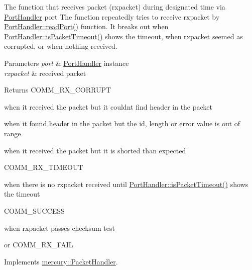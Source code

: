 The function that receives packet (rxpacket) during designated time via \hyperlink{classmercury_1_1_port_handler}{Port\+Handler} port  The function repeatedly tries to receive rxpacket by \hyperlink{classmercury_1_1_port_handler_afa6f52d7b95c5ffd8f0c92477d517c79}{Port\+Handler\+::read\+Port()} function.  It breaks out  when \hyperlink{classmercury_1_1_port_handler_a6733438255ede3d34738842e10cd8fc2}{Port\+Handler\+::is\+Packet\+Timeout()} shows the timeout,  when rxpacket seemed as corrupted, or  when nothing received. 


\begin{DoxyParams}{Parameters}
{\em port} & \hyperlink{classmercury_1_1_port_handler}{Port\+Handler} instance \\
\hline
{\em rxpacket} & received packet \\
\hline
\end{DoxyParams}
\begin{DoxyReturn}{Returns}
C\+O\+M\+M\+\_\+\+R\+X\+\_\+\+C\+O\+R\+R\+U\+PT 

when it received the packet but it couldn\textquotesingle{}t find header in the packet 

when it found header in the packet but the id, length or error value is out of range 

when it received the packet but it is shorted than expected 

C\+O\+M\+M\+\_\+\+R\+X\+\_\+\+T\+I\+M\+E\+O\+UT 

when there is no rxpacket received until \hyperlink{classmercury_1_1_port_handler_a6733438255ede3d34738842e10cd8fc2}{Port\+Handler\+::is\+Packet\+Timeout()} shows the timeout 

C\+O\+M\+M\+\_\+\+S\+U\+C\+C\+E\+SS 

when rxpacket passes checksum test 

or C\+O\+M\+M\+\_\+\+R\+X\+\_\+\+F\+A\+IL 
\end{DoxyReturn}


Implements \hyperlink{classmercury_1_1_packet_handler_a01a3929c3514eac14b4ca5a61b498e20}{mercury\+::\+Packet\+Handler}.


